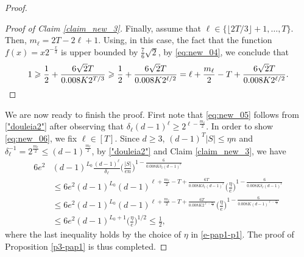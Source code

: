 \documentclass[10pt,a4paper]{amsart}
\begin{document}
\begin{proof}
\begin{proof}[Proof of Claim \ref{claim_new_3}]
Finally, assume that $\ell \in \{\lfloor2T/3\rfloor+1,\dots,T\}$.
Then, $m_\ell = 2T - 2\ell +1$. Using, in this case, the fact that the function $f(x)=x2^{-\frac{x}{3}}$ is upper bounded by $\frac{7}{6}\sqrt{2}$, by \eqref{eq:new_04}, we conclude that
\[ 1\geqslant \frac{1}{2} + \frac{6\sqrt{2}T}{0.008 K 2^{T/3}} \geqslant
\frac{1}{2} + \frac{6\sqrt{2}T}{0.008 K 2^{\ell/2}}=
\ell +\frac{m_\ell}{2} -T + \frac{6\sqrt{2}T}{0.008 K 2^{\ell/2}}. \qedhere \]
\end{proof}
We are now ready to finish the proof.
First note that \eqref{eq:new_05} follows from \eqref{"douleia2"}
after observing that $\delta_\ell (d-1)^\ell \geqslant 2^{\ell-\frac{m_\ell}{2}}$.
In order to show \eqref{eq:new_06}, we fix $\ell\in [T]$. Since $d\geqslant3$, $(d-1)^T|S|\leqslant \eta n$
and $\delta_\ell^{-1} = 2^{\frac{m_\ell}{2}} \leqslant (d-1)^{\frac{m_\ell}{2}}$, by \eqref{"douleia2"} and
Claim \ref{claim_new_3}, we have
\begin{align*}
 6e^2&(d-1)^{L_0}\frac{(d-1)^\ell}{\delta_\ell} \Big(\frac{|S|}{en}\Big)^{1-\frac{6}{0.008 K \delta_\ell (d-1)^\ell}} \\
  & \leqslant 6e^2(d-1)^{L_0}(d-1)^{\ell+\frac{m_\ell}{2}-T+\frac{6T}{0.008 K \delta_\ell (d-1)^\ell}}
  \Big(\frac{\eta}{e}\Big)^{1-\frac{6}{0.008 K \delta_\ell (d-1)^{\ell}}} \\
  & \leqslant 6e^2(d-1)^{L_0}(d-1)^{\ell+\frac{m_\ell}{2}-T+\frac{6T}{0.008 K 2^{\ell-\frac{m_\ell}{2}}}}
  \Big(\frac{\eta}{e}\Big)^{1-\frac{6}{0.008 K (d-1)^{\ell-\frac{m_\ell}{2}}}} \\
  & \leqslant 6e^2(d-1)^{L_0+1} \Big(\frac{\eta}{e}\Big)^{1/2} \leqslant\frac{1}{2},
\end{align*}
where the last inequality holds by the choice of $\eta$ in \eqref{e-pap1-p1}. The proof of Proposition \ref{p3-pap1}
is thus completed.
\end{proof}
\end{document}
